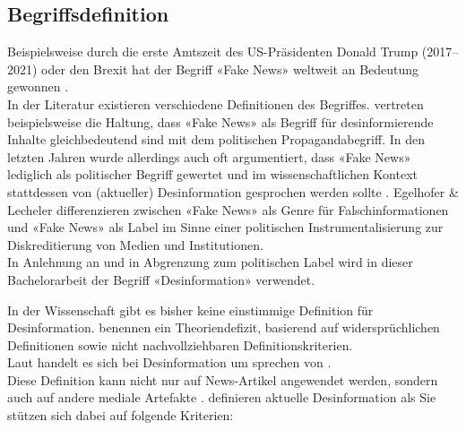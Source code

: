 \documentclass[12pt,a4paper]{article}        %
\begin{document}
\subsection{Begriffsdefinition}
\label{theory_definition}
Beispielsweise durch die erste Amtszeit des US-Präsidenten Donald Trump (2017–2021) oder den Brexit hat der Begriff «Fake News» weltweit an Bedeutung gewonnen \parencites[1f]{hohlfeld_schlechte_2020}[1]{marx_fake_2020}. \\
In der Literatur existieren verschiedene Definitionen des Begriffes. \textcite[246f]{hohlfeld_schlechte_2020} vertreten beispielsweise die Haltung, dass «Fake News» als Begriff für desinformierende Inhalte gleichbedeutend sind mit dem politischen Propagandabegriff. In den letzten Jahren wurde allerdings auch oft argumentiert, dass «Fake News» lediglich als politischer Begriff gewertet und im wissenschaftlichen Kontext stattdessen von (aktueller) Desinformation gesprochen werden sollte \parencites[3]{bontridder_role_2021}{habgood-coote_stop_2019}[148]{marx_fake_2020}. Egelhofer \& Lecheler \parencite[zit.\ nach][148]{marx_fake_2020} differenzieren zwischen «Fake News» als Genre für Falschinformationen und «Fake News» als Label im Sinne einer politischen Instrumentalisierung zur Diskreditierung von Medien und Institutionen.\\
In Anlehnung an \textcite{marx_fake_2020} und in Abgrenzung zum politischen Label wird in dieser Bachelorarbeit der Begriff «Desinformation» verwendet.

In der Wissenschaft gibt es bisher keine einstimmige Definition für Desinformation.
\textcite[148f]{marx_fake_2020} benennen ein Theoriendefizit, basierend auf widersprüchlichen Definitionen sowie nicht nachvollziehbaren Definitionskriterien.\\
Laut \textcite[1094]{lazer_science_2018} handelt es sich bei Desinformation um 
\textcite[213]{allcott_social_2017} sprechen von  \parencites[vgl.\ auch][140]{tandoc_jr_defining_2018}[1094]{lazer_science_2018}.\\
Diese Definition kann nicht nur auf News-Artikel angewendet werden, sondern auch auf andere mediale Artefakte \parencite[3]{bontridder_role_2021} \parencite[vgl.\ auch][16]{reuter_fake_2019}. \textcite[1]{marx_fake_2020} definieren aktuelle Desinformation als  Sie stützen sich dabei auf folgende Kriterien:
\end{document}

